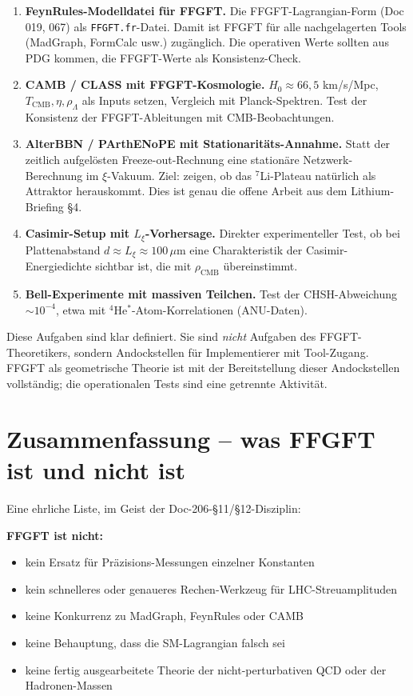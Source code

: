 \documentclass[11pt,a4paper]{article}
\begin{document}
\begin{enumerate}\itemsep2pt
\item \textbf{FeynRules-Modelldatei für FFGFT.} Die FFGFT-Lagrangian-Form (Doc 019, 067) als \texttt{FFGFT.fr}-Datei. Damit ist FFGFT für alle nachgelagerten Tools (MadGraph, FormCalc usw.) zugänglich. Die operativen Werte sollten aus PDG kommen, die FFGFT-Werte als Konsistenz-Check.

\item \textbf{CAMB / CLASS mit FFGFT-Kosmologie.} $H_0 \approx 66{,}5$ km/s/Mpc, $T_{\mathrm{CMB}}, \eta, \rho_\Lambda$ als Inputs setzen, Vergleich mit Planck-Spektren. Test der Konsistenz der FFGFT-Ableitungen mit CMB-Beobachtungen.

\item \textbf{AlterBBN / PArthENoPE mit Stationaritäts-Annahme.} Statt der zeitlich aufgelösten Freeze-out-Rechnung eine stationäre Netzwerk-Berechnung im $\xi$-Vakuum. Ziel: zeigen, ob das $^7$Li-Plateau natürlich als Attraktor herauskommt. Dies ist genau die offene Arbeit aus dem Lithium-Briefing \S 4.

\item \textbf{Casimir-Setup mit $L_\xi$-Vorhersage.} Direkter experimenteller Test, ob bei Plattenabstand $d \approx L_\xi \approx 100\,\mu$m eine Charakteristik der Casimir-Energiedichte sichtbar ist, die mit $\rho_{\mathrm{CMB}}$ übereinstimmt.

\item \textbf{Bell-Experimente mit massiven Teilchen.} Test der CHSH-Abweichung $\sim 10^{-4}$, etwa mit $^4$He$^*$-Atom-Korrelationen (ANU-Daten).
\end{enumerate}

Diese Aufgaben sind klar definiert. Sie sind \emph{nicht} Aufgaben des FFGFT-Theoretikers, sondern Andockstellen für Implementierer mit Tool-Zugang. FFGFT als geometrische Theorie ist mit der Bereitstellung dieser Andockstellen vollständig; die operationalen Tests sind eine getrennte Aktivität.

\section{Zusammenfassung -- was FFGFT ist und nicht ist}

Eine ehrliche Liste, im Geist der Doc-206-\S 11/\S 12-Disziplin:

\textbf{FFGFT ist nicht:}
\begin{itemize}\itemsep1pt
\item kein Ersatz für Präzisions-Messungen einzelner Konstanten
\item kein schnelleres oder genaueres Rechen-Werkzeug für LHC-Streuamplituden
\item keine Konkurrenz zu MadGraph, FeynRules oder CAMB
\item keine Behauptung, dass die SM-Lagrangian falsch sei
\item keine fertig ausgearbeitete Theorie der nicht-perturbativen QCD oder der Hadronen-Massen
\end{itemize}
\end{document}
